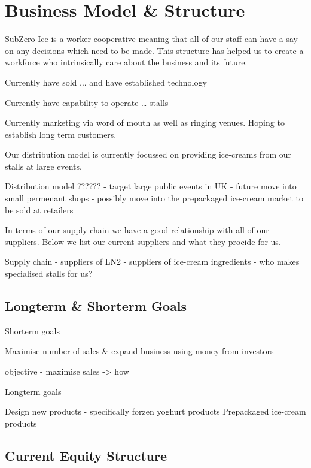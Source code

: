 \documentclass{article}
\begin{document}
\section{Business Model \& Structure}

SubZero Ice is a worker cooperative meaning that all of our staff can have a say on any decisions which need to be made. This structure has helped us to create a workforce who intrinsically care about the business and its future. 

Currently have sold ... and have established technology

Currently have capability to operate … stalls

Currently marketing via word of mouth as well as ringing venues.
Hoping to establish long term customers.

Our distribution model is currently focussed on providing ice-creams from our stalls at large events.

Distribution model ??????
 - target large public events in UK
 - future move into small permenant shops
 - possibly move into the prepackaged ice-cream market to be sold at retailers

In terms of our supply chain we have a good relationship with all of our suppliers. Below we list our current suppliers and what they procide for us.

Supply chain
- suppliers of LN2
- suppliers of ice-cream ingredients
- who makes specialised stalls for us?

  \subsection{Longterm \& Shorterm Goals}

    Shorterm goals

    Maximise number of sales & expand business using money from investors

    objective - maximise sales -> how

    Longterm goals

    Design new products - specifically forzen yoghurt products
    Prepackaged ice-cream products

  \subsection{Current Equity Structure}
\end{document}
